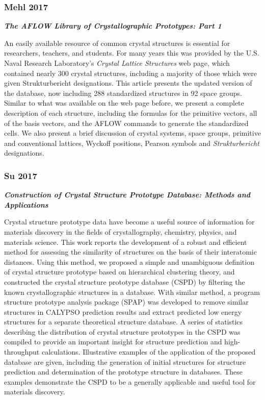 \documentclass[11pt]{article}
\begin{document}
    \subsubsection{Mehl 2017}\label{mehl-2017}

\textbf{\emph{The AFLOW Library of Crystallographic Prototypes: Part 1}}

An easily available resource of common crystal structures is essential
for researchers, teachers, and students. For many years this was
provided by the U.S. Naval Research Laboratory's \emph{Crystal Lattice
Structures} web page, which contained nearly 300 crystal structures,
including a majority of those which were given Strukturbericht
designations. This article presents the updated version of the database,
now including 288 standardized structures in 92 space groups. Similar to
what was available on the web page before, we present a complete
description of each structure, including the formulas for the primitive
vectors, all of the basis vectors, and the AFLOW commands to generate
the standardized cells. We also present a brief discussion of crystal
systems, space groups, primitive and conventional lattices, Wyckoff
positions, Pearson symbols and \emph{Strukturbericht} designations.

    \subsubsection{Su 2017}\label{su-2017}

\textbf{\emph{Construction of Crystal Structure Prototype Database:
Methods and Applications}}

Crystal structure prototype data have become a useful source of
information for materials discovery in the fields of crystallography,
chemistry, physics, and materials science. This work reports the
development of a robust and efficient method for assessing the
similarity of structures on the basis of their interatomic distances.
Using this method, we proposed a simple and unambiguous definition of
crystal structure prototype based on hierarchical clustering theory, and
constructed the crystal structure prototype database (CSPD) by filtering
the known crystallographic structures in a database. With similar
method, a program structure prototype analysis package (SPAP) was
developed to remove similar structures in CALYPSO prediction results and
extract predicted low energy structures for a separate theoretical
structure database. A series of statistics describing the distribution
of crystal structure prototypes in the CSPD was compiled to provide an
important insight for structure prediction and high-throughput
calculations. Illustrative examples of the application of the proposed
database are given, including the generation of initial structures for
structure prediction and determination of the prototype structure in
databases. These examples demonstrate the CSPD to be a generally
applicable and useful tool for materials discovery.


    
    
    
    
\end{document}
